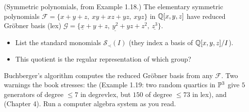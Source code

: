 \begin{yourturn}
(Symmetric polynomials, from Example 1.18.) The elementary symmetric polynomials
$\mathcal F=\{x+y+z,\ xy+xz+yz,\ xyz\}$ in $\mathbb{Q}[x,y,z]$ have reduced Gröbner basis (lex)
$\mathcal G=\{\underline{x}+y+z,\ \underline{y^2}+yz+z^2,\ \underline{z^3}\}$.
\begin{itemize}[leftmargin=1.3em,itemsep=0pt]
  \item List the \fillin[1cm] standard monomials $\mathcal S_\prec(I)$ (they index a basis of $\mathbb{Q}[x,y,z]/I$).
  \item This quotient is the regular representation of which group? \fillin[2cm]
\end{itemize}
\end{yourturn}

\begin{strand}
Buchberger's algorithm computes the reduced Gröbner basis from any $\mathcal F$. Two warnings the
book stresses: the  (Example 1.19: two random quartics in
$\mathbb{P}^3$ give $5$ generators of degree $\le7$ in degrevlex, but $150$ of degree $\le73$ in lex), and
 (Chapter 4). Run a computer algebra system as you read.
\end{strand}


